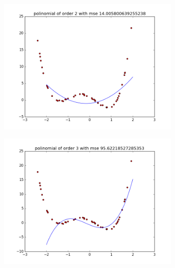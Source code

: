 \documentclass{article}
\begin{document}
\begin{figure}
\centering
        \begin{subfigure}[b]{0.48\textwidth}
                \centering
                \includegraphics[width=\linewidth]{poli-order-2}
        \end{subfigure}\hfill
        \begin{subfigure}[b]{0.48\textwidth}
                \centering
                \includegraphics[width=\linewidth]{poli-order-3}
        \end{subfigure}\hfill
 \label{fig:3}
 \end{figure}
       
\end{document}
